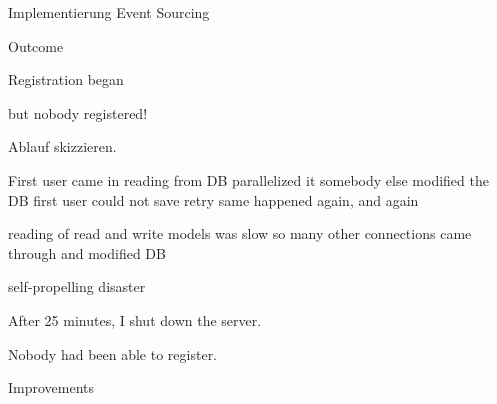 \begin{frame}[fragile]{}

Implementierung Event Sourcing

\end{frame}

\begin{frame}[fragile]{}

{
\LARGE

Outcome
}

\end{frame}

\begin{frame}[fragile]{}

Registration began
                  
                  but nobody registered!
                  
\end{frame}

\begin{frame}[fragile]{}

Ablauf skizzieren. 
                  
                  First user came in
                  reading from DB parallelized it
                  somebody else modified the DB
                  first user could not save
                  retry
                  same happened again, and again
                  
                  reading of read and write models was slow
                  so many other connections came through and modified DB
                  
                  self-propelling disaster
                  
\end{frame}

\begin{frame}[fragile]{}

After 25 minutes, I shut down the server.
                  
                  Nobody had been able to register.
                  
\end{frame}

\begin{frame}[fragile]{}

{
\LARGE

Improvements
}

\end{frame}

